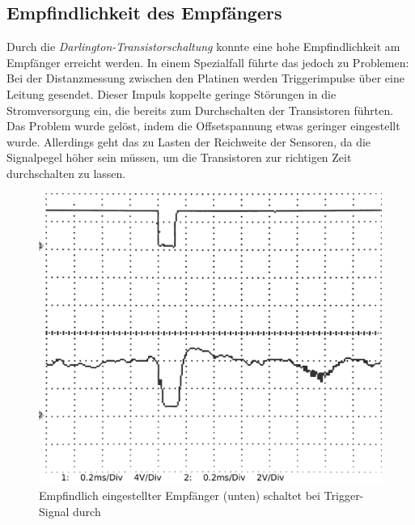 \subsection{Empfindlichkeit des Empfängers}
Durch die \textit{Darlington-Transistorschaltung} konnte eine hohe Empfindlichkeit am Empfänger erreicht werden. In einem Spezialfall führte das jedoch zu Problemen: Bei der Distanzmessung zwischen den Platinen werden Triggerimpulse über eine Leitung gesendet. Dieser Impuls koppelte geringe Störungen in die Stromversorgung ein, die bereits zum Durchschalten der Transistoren führten. Das Problem wurde gelöst, indem die Offsetspannung etwas geringer eingestellt wurde. Allerdings geht das zu Lasten der Reichweite der Sensoren, da die Signalpegel höher sein müssen, um die Transistoren zur richtigen Zeit durchschalten zu lassen.
\begin{figure}[H]
	\centering
	\includegraphics[width=(\textwidth)]{oszi/15-05-30/1.png}
	\caption{Empfindlich eingestellter Empfänger (unten) schaltet bei Trigger-Signal durch} \label{img:triggerimpuls}
\end{figure}


